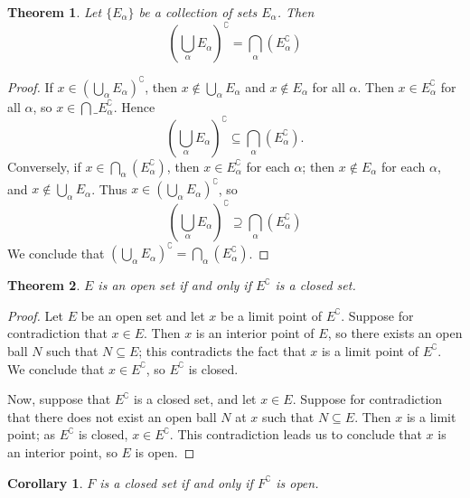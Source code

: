 \documentclass[11pt]{article}
\newtheorem{theorem}{Theorem}
\newtheorem{corollary}{Corollary}
\begin{document}
\newpage

\begin{theorem}
	Let $\{ E_{\alpha} \}$ be a collection of sets $E_{\alpha}$. Then
	\[
		\left( \bigcup\limits_{\alpha} E_{\alpha} \right)^{\complement} = \bigcap\limits_{\alpha} \left( E_{\alpha}^{\complement} \right)
	\]
\end{theorem}
\begin{adjustwidth}{1cm}{}
	\begin{proof}
		If $x \in \left( \bigcup_{\alpha} E_{\alpha} \right)^{\complement}$, then $x \notin \bigcup_{\alpha} E_{\alpha}$ and $x \notin E_{\alpha}$ for all $\alpha$. Then $x \in E_{\alpha}^{\complement}$ for all $\alpha$, so $x \in \bigcap\_{E_{\alpha}^{\complement}}$. Hence 
		\[
			\left( \bigcup_{\alpha} E_{\alpha} \right)^{\complement} \subseteq \bigcap\limits_{\alpha} \left( E_{\alpha}^{\complement} \right).
		\]
		Conversely, if $x \in \bigcap\limits_{\alpha} \left( E_{\alpha}^{\complement} \right)$, then $x \in E_{\alpha}^{\complement}$ for each $\alpha$; then $x \notin E_{\alpha}$ for each $\alpha$, and $x \notin \bigcup_{\alpha} E_{\alpha}$. Thus $x \in \left( \bigcup_{\alpha} E_{\alpha} \right)^{\complement}$, so
		\[
			\left( \bigcup\limits_{\alpha} E_{\alpha} \right)^{\complement} \supseteq \bigcap\limits_{\alpha} \left( E_{\alpha}^{\complement} \right)
		\]
		We conclude that $ \left( \bigcup_{\alpha} E_{\alpha} \right)^{\complement} = \bigcap_{\alpha} \left( E_{\alpha}^{\complement} \right)$.
	\end{proof}
\end{adjustwidth}


\begin{theorem}
	$E$ is an open set if and only if $E^{\complement}$ is a closed set.
\end{theorem}
\begin{adjustwidth}{1cm}{}
	\begin{proof}
		Let $E$ be an open set and let $x$ be a limit point of $E^{\complement}$. Suppose for contradiction that $x \in E$. Then $x$ is an interior point of $E$, so there exists an open ball $N$ such that $N \subseteq E$; this contradicts the fact that $x$ is a limit point of $E^{\complement}$. We conclude that $x \in E^{\complement}$, so $E^{\complement}$ is closed.

		Now, suppose that $E^{\complement}$ is a closed set, and let $x \in E$. Suppose for contradiction that there does not exist an open ball $N$ at $x$ such that $N \subseteq E$. Then $x$ is a limit point; as $E^{\complement}$ is closed, $x \in E^{\complement}$. This contradiction leads us to conclude that $x$ is an interior point, so $E$ is open.
	\end{proof}
\end{adjustwidth}
\begin{corollary}
	$F$ is a closed set if and only if $F^{\complement}$ is open.
\end{corollary}
\end{document}
